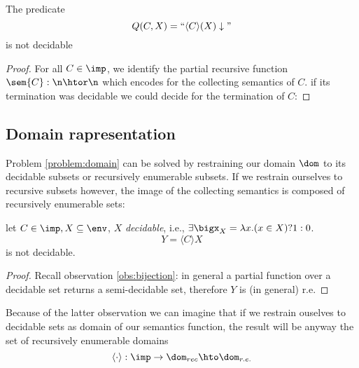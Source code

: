 \begin{theorem}
  The predicate \[Q(C,X) = ``\langle C \rangle (X)
  \downarrow\text{''}\] is not decidable
\end{theorem}

\begin{proof}
  For all \(C\in\imp\), we identify the partial recursive function
  \(\sem{C} : \n \htor \n\) which encodes for the collecting semantics
  of \(C\). if its termination was decidable we could decide for the
  termination of \(C\):
\end{proof}

\subsection{Domain rapresentation}\label{decide:dom}
Problem \ref{problem:domain} can be solved by restraining our domain
\(\dom\) to its decidable subsets or recursively enumerable
subsets. If we restrain ourselves to recursive subsets however, the
image of the collecting semantics is composed of recursively
enumerable sets:

\begin{theorem}\label{th:domain}
  let \(C\in\imp, X\subseteq\env\), \(X\) \emph{decidable}, i.e.,
  \(\exists \bigx_X = \lambda x . (x \in X) ? 1 : 0\). \[Y = \langle C
  \rangle X\] is not decidable.
\end{theorem}

\begin{proof}\label{proof:domain}
  Recall observation \ref{obs:bijection}: in general a partial
  function over a decidable set returns a semi-decidable set,
  therefore \(Y\) is (in general) r.e.
\end{proof}

Because of the latter observation we can imagine that if we restrain
ouselves to decidable sets as domain of our semantics function, the
result will be anyway the set of recursively enumerable
domains \[\langle \cdot \rangle : \imp \to \dom_{rec} \hto
\dom_{r.e.}\]
